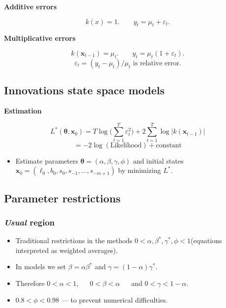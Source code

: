\documentclass[]{book}
\providecommand{\tightlist}{%
  \setlength{\itemsep}{0pt}\setlength{\parskip}{0pt}}
\begin{document}
\textbf{Additive errors}

\[k(x)=1. \qquad y_t = \mu_{t} + \varepsilon_t.\]

\textbf{Multiplicative errors}

\[k(\mathbf{x}_{t-1}) = \mu_{t}.\qquad y_t = \mu_{t}(1 + \varepsilon_t).\]
\[\varepsilon_t = (y_t - \mu_t)/\mu_t \text{  is  relative error}.\]

\hypertarget{innovations-state-space-models-2}{%
\subsection{Innovations state space models}\label{innovations-state-space-models-2}}

\textbf{Estimation}

\[L^*(\mathbf\theta,\mathbf{x}_0) = T\log\!\bigg(\sum_{t=1}^T \varepsilon^2_t\!\bigg) + 2\sum_{t=1}^T \log|k(\mathbf{x}_{t-1})|\]
\[= -2\log(\text{Likelihood}) + \mbox{constant}\]

\begin{itemize}
\tightlist
\item
  Estimate parameters \(\mathbf\theta = (\alpha,\beta,\gamma,\phi)\) and
  initial states \(\mathbf{x}_0 = (\ell_0,b_0,s_0,s_{-1},\dots,s_{-m+1})\) by
  minimizing \(L^*\).
\end{itemize}

\hypertarget{parameter-restrictions}{%
\subsection{Parameter restrictions}\label{parameter-restrictions}}

\hypertarget{usual-region}{%
\subsubsection{\texorpdfstring{\emph{Usual} region}{Usual region}}\label{usual-region}}

\begin{itemize}
\tightlist
\item
  Traditional restrictions in the methods \(0< \alpha,\beta^*,\gamma^*,\phi<1\)\newline (equations interpreted as weighted averages).
\item
  In models we set \(\beta=\alpha\beta^*\) and \(\gamma=(1-\alpha)\gamma^*\).
\item
  Therefore \(0< \alpha <1\), ~~ \(0 < \beta < \alpha\) ~~ and \(0< \gamma < 1-\alpha\).
\item
  \(0.8<\phi<0.98\) --- to prevent numerical difficulties.
\end{itemize}
\end{document}
